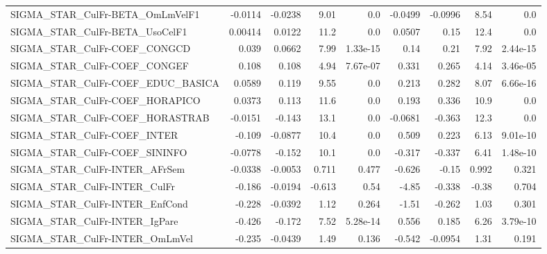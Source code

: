 \begin{tabular}{lrrrrrrrr}
SIGMA\_STAR\_CulFr-BETA\_OmLmVelF1       &     -0.0114 &      -0.0238 &    9.01 &      0.0 &    -0.0499 &     -0.0996 &         8.54 &           0.0 \\
SIGMA\_STAR\_CulFr-BETA\_UsoCelF1        &     0.00414 &       0.0122 &    11.2 &      0.0 &     0.0507 &        0.15 &         12.4 &           0.0 \\
SIGMA\_STAR\_CulFr-COEF\_CONGCD          &       0.039 &       0.0662 &    7.99 & 1.33e-15 &       0.14 &        0.21 &         7.92 &      2.44e-15 \\
SIGMA\_STAR\_CulFr-COEF\_CONGEF          &       0.108 &        0.108 &    4.94 & 7.67e-07 &      0.331 &       0.265 &         4.14 &      3.46e-05 \\
SIGMA\_STAR\_CulFr-COEF\_EDUC\_BASICA     &      0.0589 &        0.119 &    9.55 &      0.0 &      0.213 &       0.282 &         8.07 &      6.66e-16 \\
SIGMA\_STAR\_CulFr-COEF\_HORAPICO        &      0.0373 &        0.113 &    11.6 &      0.0 &      0.193 &       0.336 &         10.9 &           0.0 \\
SIGMA\_STAR\_CulFr-COEF\_HORASTRAB       &     -0.0151 &       -0.143 &    13.1 &      0.0 &    -0.0681 &      -0.363 &         12.3 &           0.0 \\
SIGMA\_STAR\_CulFr-COEF\_INTER           &      -0.109 &      -0.0877 &    10.4 &      0.0 &      0.509 &       0.223 &         6.13 &      9.01e-10 \\
SIGMA\_STAR\_CulFr-COEF\_SININFO         &     -0.0778 &       -0.152 &    10.1 &      0.0 &     -0.317 &      -0.337 &         6.41 &      1.48e-10 \\
SIGMA\_STAR\_CulFr-INTER\_AFrSem         &     -0.0338 &      -0.0053 &   0.711 &    0.477 &     -0.626 &       -0.15 &        0.992 &         0.321 \\
SIGMA\_STAR\_CulFr-INTER\_CulFr          &      -0.186 &      -0.0194 &  -0.613 &     0.54 &      -4.85 &      -0.338 &        -0.38 &         0.704 \\
SIGMA\_STAR\_CulFr-INTER\_EnfCond        &      -0.228 &      -0.0392 &    1.12 &    0.264 &      -1.51 &      -0.262 &         1.03 &         0.301 \\
SIGMA\_STAR\_CulFr-INTER\_IgPare         &      -0.426 &       -0.172 &    7.52 & 5.28e-14 &      0.556 &       0.185 &         6.26 &      3.79e-10 \\
SIGMA\_STAR\_CulFr-INTER\_OmLmVel        &      -0.235 &      -0.0439 &    1.49 &    0.136 &     -0.542 &     -0.0954 &         1.31 &         0.191 \\

\end{tabular}

